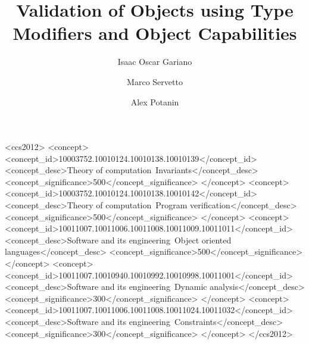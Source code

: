 \documentclass[english,submission,code=tt]{programming}
\theoremstyle{plain}
\begin{document}
\title{Validation of Objects using Type Modifiers and Object Capabilities}
\author{Isaac Oscar Gariano}
\author{Marco Servetto}
\author{Alex Potanin}



\begin{CCSXML}
<ccs2012>
	<concept>
		<concept_id>10003752.10010124.10010138.10010139</concept_id>
		<concept_desc>Theory of computation~Invariants</concept_desc>
		<concept_significance>500</concept_significance>
	</concept>
	<concept>
		<concept_id>10003752.10010124.10010138.10010142</concept_id>
		<concept_desc>Theory of computation~Program verification</concept_desc>
		<concept_significance>500</concept_significance>
	</concept>
	<concept>
		<concept_id>10011007.10011006.10011008.10011009.10011011</concept_id>
		<concept_desc>Software and its engineering~Object oriented languages</concept_desc>
		<concept_significance>500</concept_significance>
	</concept>
	<concept>
		<concept_id>10011007.10010940.10010992.10010998.10011001</concept_id>
		<concept_desc>Software and its engineering~Dynamic analysis</concept_desc>
		<concept_significance>300</concept_significance>
	</concept>
	<concept>
		<concept_id>10011007.10011006.10011008.10011024.10011032</concept_id>
		<concept_desc>Software and its engineering~Constraints</concept_desc>
		<concept_significance>300</concept_significance>
	</concept>
</ccs2012>
\end{CCSXML}


\maketitle
\end{document}
